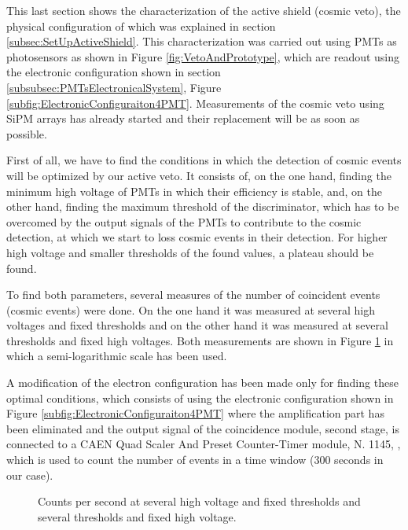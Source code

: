 This last section shows the characterization of the active shield (cosmic veto), the physical configuration of which was explained in section \ref{subsec:SetUpActiveShield}. This characterization was carried out using PMTs as photosensors as shown in Figure \ref{fig:VetoAndPrototype}, which are readout using the electronic configuration shown in section \ref{subsubsec:PMTsElectronicalSystem}, Figure \ref{subfig:ElectronicConfiguraiton4PMT}. Measurements of the cosmic veto using SiPM arrays has already started and their replacement will be as soon as possible. 

First of all, we have to find the conditions in which the detection of cosmic events will be optimized by our active veto. It consists of, on the one hand, finding the minimum high voltage of PMTs in which their efficiency is stable, and, on the other hand, finding the maximum threshold of the discriminator, which has to be overcomed by the output signals of the PMTs to contribute to the cosmic detection, at which we start to loss cosmic events in their detection. For higher high voltage and smaller thresholds of the found values, a plateau should be found.

To find both parameters, several measures of the number of coincident events (cosmic events) were done. On the one hand it was measured at several high voltages and fixed thresholds and on the other hand it was measured at several thresholds and fixed high voltages. Both measurements are shown in Figure \ref{fig:HVandThresholdsPLateaus} in which a semi-logarithmic scale has been used.

A modification of the electron configuration has been made only for finding these optimal conditions, which consists of using the electronic configuration shown in Figure \ref{subfig:ElectronicConfiguraiton4PMT} where the amplification part has been eliminated and the output signal of the coincidence module, second stage, is connected to a CAEN Quad Scaler And Preset Counter-Timer module, N. 1145, \cite{ScalerDataSheet}, which is used to count the number of events in a time window ($300$ seconds in our case).

\begin{figure}[]
 \centering
    \newline
 \caption{Counts per second at several high voltage and fixed thresholds and several thresholds and fixed high voltage.}
 \label{fig:HVandThresholdsPLateaus}
\end{figure}

